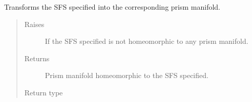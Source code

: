 \documentclass[letterpaper,10pt,english]{sphinxmanual}
\begin{document}
\begin{fulllineitems}
\begin{fulllineitems}
\label{\detokenize{soapy:soapy.SFS.to_prism_mfld}}
\sphinxAtStartPar
Transforms the SFS specified into the corresponding prism manifold.
\begin{quote}\begin{description}
\item[{Raises}] \leavevmode
\sphinxAtStartPar
{} \textendash{} If the SFS specified is not homeomorphic to any prism manifold.

\item[{Returns}] \leavevmode
\sphinxAtStartPar
Prism manifold homeomorphic to the SFS specified.

\item[{Return type}] \leavevmode
\sphinxAtStartPar
{\hyperref[\detokenize{soapy:soapy.Prism}]{}}

\end{description}\end{quote}

\end{fulllineitems}


\end{fulllineitems}

\end{document}
